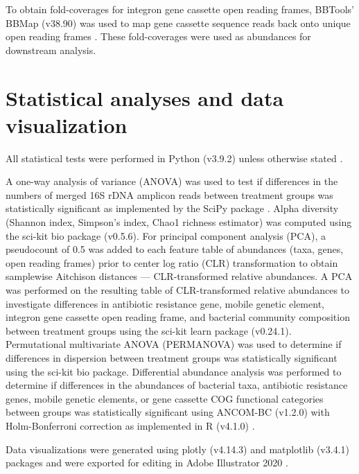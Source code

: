 To obtain fold-coverages for integron gene cassette open reading frames, BBTools’ BBMap (v38.90) was used to map gene cassette sequence reads back onto unique open reading frames \parencite{Bushnell.2016}.
These fold-coverages were used as abundances for downstream analysis.

\section{Statistical analyses and data visualization}

All statistical tests were performed in Python (v3.9.2) unless otherwise stated \parencite{PythonSoftwareFoundation.}.

A one-way analysis of variance (\gls{ANOVA}) was used to test if differences in the numbers of merged 16S rDNA amplicon reads between treatment groups was statistically significant as implemented by the SciPy package \parencite{PauliVirtanen.2020}.
Alpha diversity (Shannon index, Simpson’s index, Chao1 richness estimator) was computed using the sci-kit bio package (v0.5.6).
For principal component analysis (PCA), a pseudocount of 0.5 was added to each feature table of abundances (taxa, genes, open reading frames) prior to center log ratio (\gls{CLR}) transformation to obtain samplewise Aitchison distances --- \gls{CLR}-transformed relative abundances.
A PCA was performed on the resulting table of \gls{CLR}-transformed relative abundances to investigate differences in antibiotic resistance gene, mobile genetic element, integron gene cassette open reading frame, and bacterial community composition between treatment groups using the sci-kit learn package (v0.24.1).
Permutational multivariate ANOVA (\gls{PERMANOVA}) was used to determine if differences in dispersion between treatment groups was statistically significant using the sci-kit bio package.
Differential abundance analysis was performed to determine if differences in the abundances of bacterial taxa, antibiotic resistance genes, mobile genetic elements, or gene cassette \gls{COG} functional categories between groups was statistically significant using ANCOM-BC (v1.2.0) with Holm-Bonferroni correction as implemented in R (v4.1.0) \parencite{RCoreTeam.2021, Lin.2020}.

Data visualizations were generated using plotly (v4.14.3) and matplotlib (v3.4.1) packages and were exported for editing in Adobe Illustrator 2020 \parencite{PlotlyTechnologiesInc.2015, Hunter.2007, AdobeInc.2020} .
